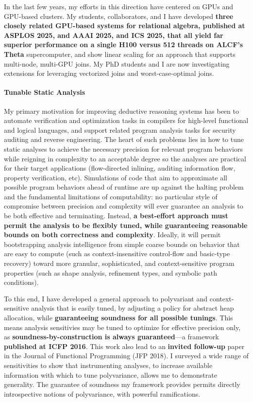 \documentclass[12pt]{article}
\begin{document}
In the last few years, my efforts in this direction have centered on GPUs and GPU-based clusters. My students, collaborators, and I have developed \textbf{three closely related GPU-based systems for relational algebra, published at ASPLOS 2025, and AAAI 2025, and ICS 2025, that all yield far superior performance on a single H100 versus 512 threads on ALCF's Theta} supercomputer, and show linear scaling for an approach that supports multi-node, multi-GPU joins. My PhD students and I are now investigating extensions for leveraging vectorized joins and worst-case-optimal joins.


\paragraph{Tunable Static Analysis}
%
My primary motivation for improving deductive reasoning systems has been to automate verification and optimization tasks in compilers for high-level functional and logical languages, and support related program analysis tasks for security auditing and reverse engineering. The heart of such problems lies in how to tune static analyses to achieve the necessary precision for relevant program behaviors while reigning in complexity to an acceptable degree so the analyses are practical for their target applications (flow-directed inlining, auditing information flow, property verification, etc).
%
Simulations of code that aim to approximate all possible program behaviors ahead of runtime are up against the halting problem and the fundamental limitations of computability: no particular style of compromise between precision and complexity will ever guarantee an analysis to be both effective and terminating. Instead, \textbf{a best-effort approach must permit the analysis to be flexibly tuned, while guaranteeing reasonable bounds on both correctness and complexity}. Ideally, it will permit bootstrapping analysis intelligence from simple coarse bounds on behavior that are easy to compute (such as context-insensitive control-flow and basic-type recovery) toward more granular, sophisticated, and context-sensitive program properties (such as shape analysis, refinement types, and symbolic path conditions).

To this end, I have developed a general approach to polyvariant and context-sensitive analysis that is easily tuned, by adjusting a policy for abstract heap allocation, while \textbf{guaranteeing soundness for all possible tunings}. This means analysis sensitivies may be tuned to optimize for effective precision only, as \textbf{soundness-by-construction is always guaranteed}---a framework \textbf{published at ICFP 2016}. This work also lead to an \textbf{invited follow-up} paper in the Journal of Functional Programming (JFP 2018). I surveyed a wide range of sensitivities to show that instrumenting analyses, to increase available information with which to tune polyvariance, allows me to demonstrate generality. The guarantee of soundness my framework provides permits directly introspective notions of polyvariance, with powerful ramifications.
\end{document}
